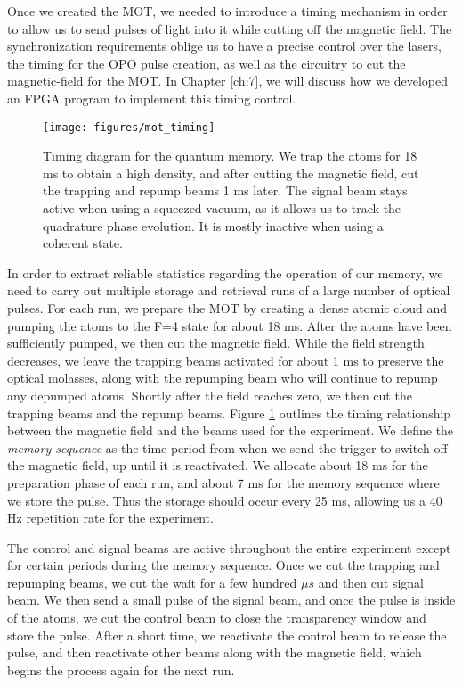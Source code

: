 Once we created the MOT, we needed to introduce a timing mechanism in order to allow us to send pulses of light into it while cutting off the magnetic field.  The synchronization requirements oblige us to have a precise control over the lasers, the timing for the OPO pulse creation, as well as the circuitry to cut the magnetic-field for the MOT.  In Chapter \ref{ch:7}, we will discuss how we developed an FPGA program to implement this timing control.


\begin{figure}[!ht] 
 \centering 
 \texttt{[image: figures/mot\_timing]} 
 \caption[MOT timing diagram]{Timing diagram for the quantum memory.  We trap the atoms for 18 ms to obtain a high density, and after cutting the magnetic field, cut the trapping and repump beams 1 ms later.  The signal beam stays active when using a squeezed vacuum, as it allows us to track the quadrature phase evolution.  It is mostly inactive when using a coherent state.} 
 \label{fig:mot_timing} 
\end{figure}

In order to extract reliable statistics regarding the operation of our memory,
we need to carry out multiple storage and retrieval runs of a large number of
optical pulses.  For each run, we prepare the MOT by creating a dense atomic
cloud and pumping the atoms to the F=4 state for about 18 ms.  After the atoms
have been sufficiently pumped, we then cut the magnetic field.  While the
field strength decreases, we leave the trapping beams activated for about 1 ms
to preserve the optical molasses, along with the repumping beam who will
continue to repump any depumped atoms.  Shortly after the field reaches zero,
we then cut the trapping beams and the repump beams.  Figure \ref{fig:mot_timing} outlines the timing relationship between the magnetic field and the beams used for the experiment.  We define the \emph{memory sequence} as the time period from when we send the trigger to switch off the magnetic field, up until it is reactivated.  We allocate about 18 ms for the preparation phase of each run, and about 7 ms for the memory sequence where we store the pulse.  Thus the storage should occur every 25 ms, allowing us a 40 Hz repetition rate for the experiment.

The control and signal beams are active throughout the entire experiment except for certain periods during the memory sequence.  Once we cut the trapping and repumping beams, we cut the wait for a few hundred $\mu s$ and then cut signal beam.   We then send a small pulse of the signal beam, and once the pulse is inside of the atoms, we cut the control beam to close the transparency window and store the pulse.   After a short time, we reactivate the control beam to release the pulse, and then reactivate other beams along with the magnetic field, which begins the process again for the next run.



